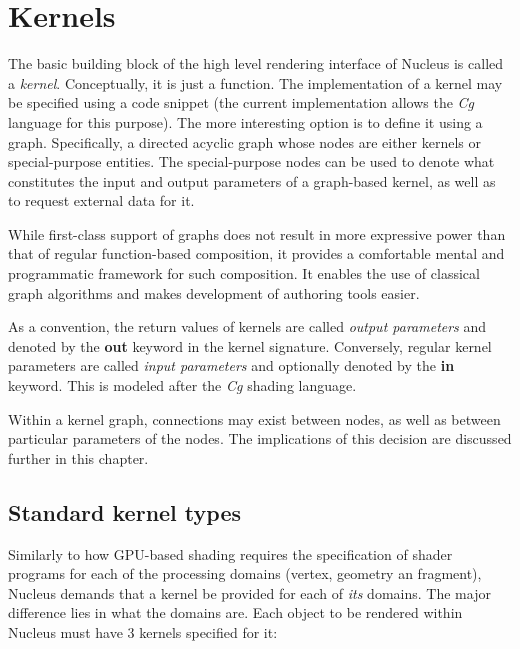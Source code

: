 \section{Kernels}
\label{sec:Kernels}

The basic building block of the high level rendering interface of Nucleus is called a \emph{kernel}. Conceptually, it is just a function. The implementation of a kernel may be specified using a code snippet (the current implementation allows the \emph{Cg} language for this purpose). The more interesting option is to define it using a graph. Specifically, a directed acyclic graph whose nodes are either kernels or special-purpose entities. The special-purpose nodes can be used to denote what constitutes the input and output parameters of a graph-based kernel, as well as to request external data for it.

While first-class support of graphs does not result in more expressive power than that of regular function-based composition, it provides a comfortable mental and programmatic framework for such composition. It enables the use of classical graph algorithms and makes development of authoring tools easier.

As a convention, the return values of kernels are called \emph{output parameters} and denoted by the \textbf{out} keyword in the kernel signature. Conversely, regular kernel parameters are called \emph{input parameters} and optionally denoted by the \textbf{in} keyword. This is modeled after the \emph{Cg} shading language.

Within a kernel graph, connections may exist between nodes, as well as between particular parameters of the nodes. The implications of this decision are discussed further in this chapter.

\subsection{Standard kernel types}

Similarly to how GPU-based shading requires the specification of shader programs for each of the processing domains (vertex, geometry an fragment), Nucleus demands that a kernel be provided for each of \emph{its} domains. The major difference lies in what the domains are. Each object to be rendered within Nucleus must have 3 kernels specified for it:

